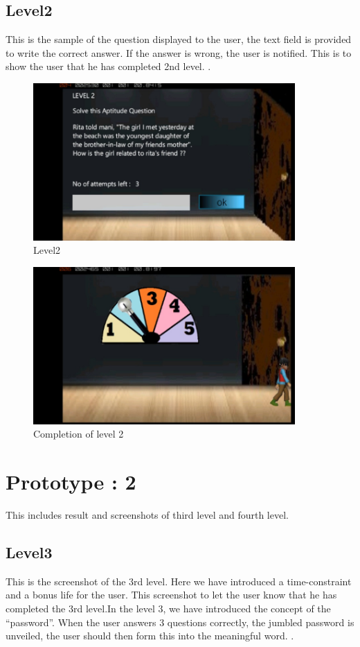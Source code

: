 \subsection{Level2}
\hspace{1cm}This is the sample of the question displayed to the user, the text field is provided 
to write the correct answer. If the answer is wrong, the user is notified.   
This is to show the user that he has completed 2nd level.
 \cite{DBLP:journals/ivc/KadyrovP03}.\\
\begin{figure}[htbp]
	\centering
	\includegraphics[width=10cm,height=6cm]{6.jpg}
	\caption{Level2}
\end{figure}
\begin{figure}[htbp]
	\centering
	\includegraphics[width=10cm,height=6cm]{7.jpg}
	\caption{Completion of level 2}
\end{figure}

\section{Prototype : 2}
\hspace{1cm} This includes result and screenshots of third level and fourth level.
\subsection{Level3}
\hspace{1cm}This is the screenshot of the 3rd level. Here we have introduced a time-constraint and a bonus life for the user. 
This screenshot to let the user know that he has completed the 3rd level.In the level 3, we have introduced the concept of the “password”. When the user answers 3 questions correctly, the jumbled password is unveiled, the user should then form this into the meaningful word.
 \cite{DBLP:journals/ivc/KadyrovP03}.\\

